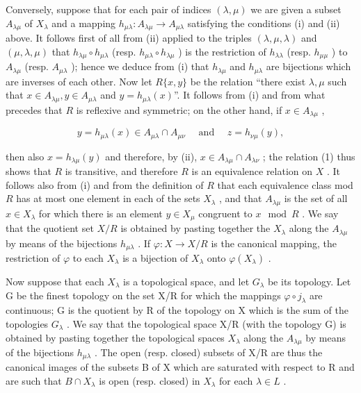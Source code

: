 Conversely, suppose that for each pair of indices \((\lambda, \mu)\) we are given a subset \(A_{\lambda \mu}\) of \(X_{\lambda}\) and a mapping \(h_{\mu \lambda}: A_{\lambda \mu} \to A_{\mu \lambda}\) satisfying the conditions (i) and (ii) above. It follows first of all from (ii) applied to the triples \((\lambda, \mu, \lambda)\) and \((\mu, \lambda, \mu)\) that \(h_{\lambda \mu} \circ h_{\mu \lambda}\) (resp. \(h_{\mu \lambda} \circ h_{\lambda \mu}\) ) is the restriction of \(h_{\lambda \lambda}\) (resp. \(h_{\mu \mu}\) ) to \(A_{\lambda \mu}\) (resp. \(A_{\mu \lambda}\) ); hence we deduce from (i) that \(h_{\lambda \mu}\) and \(h_{\mu \lambda}\) are bijections which are inverses of each other. Now let \(R\{x, y\}\) be the relation ``there exist \(\lambda, \mu\) such that \(x \in A_{\lambda \mu}, y \in A_{\mu \lambda}\) and \(y = h_{\mu \lambda}(x)\)''. It follows from (i) and from what precedes that \(R\) is reflexive and symmetric; on the other hand, if \(x \in A_{\lambda \mu}\) ,

\[
y = h _ {\mu \lambda} (x) \in A _ {\mu \lambda} \cap A _ {\mu \nu} \quad \text { and } \quad z = h _ {\nu \mu} (y),
\]

then also \(x = h_{\lambda \mu}(y)\) and therefore, by (ii), \(x \in A_{\lambda \mu} \cap A_{\lambda \nu}\) ; the relation (1) thus shows that \(R\) is transitive, and therefore \(R\) is an equivalence relation on \(X\) . It follows also from (i) and from the definition of \(R\) that each equivalence class mod \(R\) has at most one element in each of the sets \(X_{\lambda}\) , and that \(A_{\lambda \mu}\) is the set of all \(x \in X_{\lambda}\) for which there is an element \(y \in X_{\mu}\) congruent to \(x \mod R\) . We say that the quotient set \(X / R\) is obtained by pasting together the \(X_{\lambda}\) along the \(A_{\lambda \mu}\) by means of the bijections \(h_{\mu \lambda}\) . If \(\varphi: X \to X / R\) is the canonical mapping, the restriction of \(\varphi\) to each \(X_{\lambda}\) is a bijection of \(X_{\lambda}\) onto \(\varphi(X_{\lambda})\) .

Now suppose that each \(X_{\lambda}\) is a topological space, and let \(G_{\lambda}\) be its topology. Let G be the finest topology on the set X/R for which the mappings \(\varphi \circ j_{\lambda}\) are continuous; G is the quotient by R of the topology on X which is the sum of the topologies \(G_{\lambda}\) . We say that the topological space X/R (with the topology G) is obtained by pasting together the topological spaces \(X_{\lambda}\) along the \(A_{\lambda\mu}\) by means of the bijections \(h_{\mu\lambda}\) . The open (resp. closed) subsets of X/R are thus the canonical images of the subsets B of X which are saturated with respect to R and are such that \(B \cap X_{\lambda}\) is open (resp. closed) in \(X_{\lambda}\) for each \(\lambda \in L\) .

